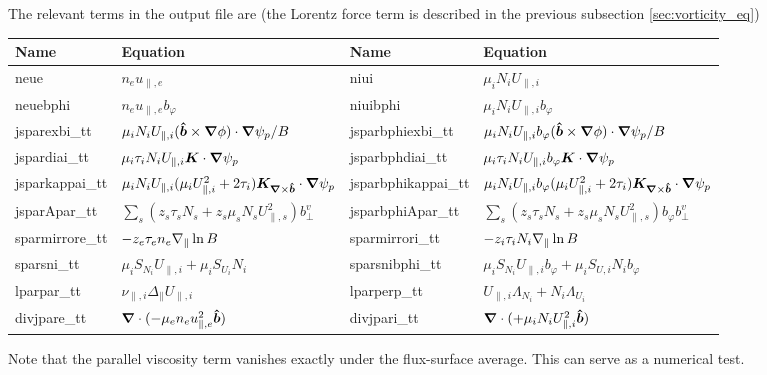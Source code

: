 The relevant terms in the output file are (the Lorentz force term is described in the previous subsection \ref{sec:vorticity_eq})
\begin{longtable}{llll}
\toprule
\rowcolor{gray!50}\textbf{Name} &  \textbf{Equation} &
\textbf{Name} &  \textbf{Equation}\\
\midrule
    neue &$n_e u_{\parallel,e}$ &
    niui &$\mu_i N_i U_{\parallel,i}$ \\
    neuebphi &$n_eu_{\parallel,e}b_\varphi$ &
    niuibphi &$\mu_i N_iU_{\parallel,i}b_\varphi$ \\
    jsparexbi\_tt       & $\mu_i N_iU_{\parallel,i}(\bm{\hat{b}}\times{\boldsymbol{\nabla}}\phi)\cdot{\boldsymbol{\nabla}} \psi_p/B$ &
    jsparbphiexbi\_tt   & $\mu_i N_iU_{\parallel,i}b_\varphi(\bm{\hat{b}}\times{\boldsymbol{\nabla}}\phi)\cdot{\boldsymbol{\nabla}} \psi_p/B$ \\
    jspardiai\_tt       & $\mu_i \tau_i N_iU_{\parallel,i}{\boldsymbol{K}}\cdot{\boldsymbol{\nabla}}\psi_p$ &
    jsparbphdiai\_tt   & $\mu_i \tau_i N_iU_{\parallel,i}b_\varphi{\boldsymbol{K}}\cdot{\boldsymbol{\nabla}}\psi_p$ \\
    jsparkappai\_tt       & $\mu_i N_iU_{\parallel,i} ( \mu_i U_{\parallel,i}^2 + 2\tau_i){\boldsymbol{K}}_{{\boldsymbol{\nabla}}\times \bm{\hat{b}}}\cdot{\boldsymbol{\nabla}}\psi_p$ &
    jsparbphikappai\_tt       & $\mu_i N_iU_{\parallel,i}b_\varphi ( \mu_i U_{\parallel,i}^2 + 2\tau_i){\boldsymbol{K}}_{{\boldsymbol{\nabla}}\times \bm{\hat{b}}}\cdot{\boldsymbol{\nabla}}\psi_p$ \\
    jsparApar\_tt       & $\sum_s (z_s \tau_s N_s + z_s \mu_s N_s U_{\parallel,s}^2)b_\perp^v$ &
    jsparbphiApar\_tt   & $\sum_s (z_s \tau_s N_s + z_s \mu_s N_s U_{\parallel,s}^2)b_\varphi b_\perp^v$ \\
    sparmirrore\_tt & $-z_e\tau_en_e\nabla_\parallel \ln B$ &
    sparmirrori\_tt & $-z_i\tau_iN_i\nabla_\parallel \ln B$ \\
    sparsni\_tt & $\mu_i S_{N_i} U_{\parallel,i} + \mu_i S_{U_i} N_i $ &
    sparsnibphi\_tt & $\mu_i S_{N_i} U_{\parallel,i}b_\varphi + \mu_i S_{U,i} N_i b_\varphi $ \\
    lparpar\_tt   & $\nu_{\parallel,i} \Delta_\parallel U_{\parallel,i}$ &
    lparperp\_tt & $U_{\parallel,i} \Lambda_{N_i} + N_i\Lambda_{U_i} $ \\
    divjpare\_tt & $ {\boldsymbol{\nabla}}\cdot( -\mu_e n_e u_{\parallel,e}^2 \bm{\hat{b}})$ &
    divjpari\_tt & $ {\boldsymbol{\nabla}}\cdot( +\mu_i N_i U_{\parallel,i}^2 \bm{\hat{b}})$ \\
\bottomrule
\end{longtable}
Note that the parallel viscosity term vanishes exactly under the flux-surface average. This can serve as a numerical test.


